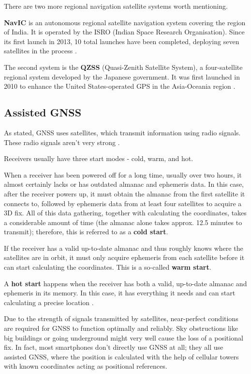 \documentclass[FM,BP,EN,fonts]{tulthesis}
\begin{document}
There are two more regional navigation satellite systems worth mentioning.

\textbf{NavIC} is an autonomous regional satellite navigation system covering the region of India. It is operated by the ISRO (Indian Space Research Organisation). Since its first launch in 2013, 10 total launches have been completed, deploying seven satellites in the process \cite{navic}.

The second system is the \textbf{QZSS} (Quasi-Zenith Satellite System), a four-satellite regional system developed by the Japanese government. It was first launched in 2010 to enhance the United States-operated GPS in the Asia-Oceania region \cite{qzss}.

\subsection{Assisted GNSS}
As stated, GNSS uses satellites, which transmit information using radio signals. These radio signals aren't very strong \cite{gnss-accuracy}.

Receivers usually have three start modes - cold, warm, and hot.

When a receiver has been powered off for a long time, usually over two hours, it almost certainly lacks or has outdated almanac and ephemeris data. In this case, after the receiver powers up, it must obtain the almanac from the first satellite it connects to, followed by ephemeris data from at least four satellites to acquire a 3D fix. All of this data gathering, together with calculating the coordinates, takes a considerable amount of time (the almanac alone takes approx. 12.5 minutes to transmit); therefore, this is referred to as a \textbf{cold start}.

If the receiver has a valid up-to-date almanac and thus roughly knows where the satellites are in orbit, it must only acquire ephemeris from each satellite before it can start calculating the coordinates. This is a so-called \textbf{warm start}.

A \textbf{hot start} happens when the receiver has both a valid, up-to-date almanac and ephemeris in its memory. In this case, it has everything it needs and can start calculating a precise location \cite{gnss-start-modes}.

Due to the strength of signals transmitted by satellites, near-perfect conditions are required for GNSS to function optimally and reliably. Sky obstructions like big buildings or going underground might very well cause the loss of a positional fix.
In fact, most smartphones don't directly use GNSS at all; they all use assisted GNSS, where the position is calculated with the help of cellular towers with known coordinates acting as positional references.
\end{document}
